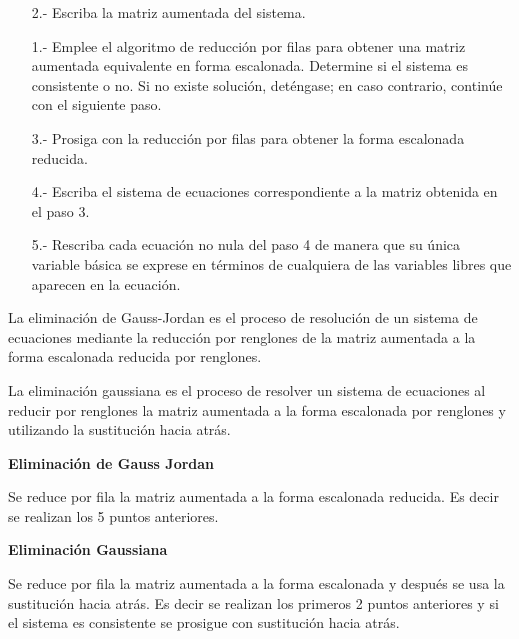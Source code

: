 \documentclass{article}
\begin{document}
\begin{tcolorbox}[colback=blue!10!white,colframe=blue!60!black,title=Uso de Reducción de Filas para Resolver un Sistema Lineal]
    \begin{itemize}
        \item[2.-] Escriba la matriz aumentada del sistema.
        \item[1.-] Emplee el algoritmo de reducción por filas para obtener una matriz aumentada equivalente en forma escalonada. Determine si el sistema es consistente o no. Si no existe solución, deténgase; en caso contrario, continúe con el siguiente paso.
        \item[3.-] Prosiga con la reducción por filas para obtener la forma escalonada reducida.
        \item[4.-] Escriba el sistema de ecuaciones correspondiente a la matriz obtenida en el paso 3.
        \item[5.-] Rescriba cada ecuación no nula del paso 4 de manera que su única variable básica se exprese en términos de cualquiera de las variables libres que aparecen en la ecuación. 
    \end{itemize}
\end{tcolorbox}

La eliminación de Gauss-Jordan es el proceso de resolución de un sistema de ecuaciones mediante la reducción por renglones de la matriz aumentada a la forma escalonada reducida por renglones.

La eliminación gaussiana es el proceso de resolver un sistema de ecuaciones al reducir por renglones la matriz aumentada a la forma escalonada por renglones y utilizando la sustitución hacia atrás.

\begin{tcolorbox}[colback=blue!10!white,colframe=blue!60!black,title=Métodos]
    \begin{large}
        \textbf{Eliminación de Gauss Jordan}
    \end{large}

    Se reduce por fila la matriz aumentada a la forma escalonada reducida. Es decir se realizan los 5 puntos anteriores. \newline

    \begin{large}
        \textbf{Eliminación Gaussiana}
    \end{large}

    Se reduce por fila la matriz aumentada a la forma escalonada y después se usa la sustitución hacia atrás. Es decir se realizan los primeros 2 puntos anteriores y si el sistema es consistente se prosigue con sustitución hacia atrás.
\end{tcolorbox}
\end{document}
